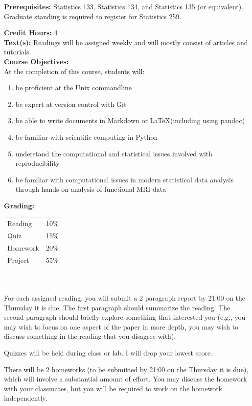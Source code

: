 \documentclass[11pt]{article}
\begin{document}
\textbf {Prerequisites:} Statistics 133, Statistics 134, and Statistics 135
(or equivalent). Graduate standing is required to register for Statistics 259.

\textbf {Credit Hours:} 4 \\

\textbf {\large Text(s):} 
Readings will be assigned weekly and will mostly consist of articles and tutorials. \\

\textbf {\large Course Objectives:} \\
At the completion of this course, students will:
\begin{enumerate} \itemsep-0.4em
  \item be proficient at the Unix commandline
  \item be expert at version control with Git
  \item be able to write documents in Markdown or \LaTeX (including using
        pandoc)
  \item be familiar with scientific computing in Python
  \item understand the computational and statistical issues involved with
        reproducibility
  \item be familiar with computational issues in modern statistical data
        analysis through hands-on analysis of functional MRI data
\end{enumerate}

\textbf {\large Grading:} \\
\hspace*{40mm}
\begin{tabular}{ l l }
Reading  & 10\% \\
Quiz  & 15\% \\
Homework & 20\% \\
Project  & 55\%
\end{tabular} \\\\

For each assigned reading, you will submit a 2 paragraph report
by 21:00 on the Thursday it is due.
The first paragraph should summarize the reading.  The second paragraph
should briefly explore something that interested you (e.g., you
may wish to focus on one aspect of the paper in more depth, you
may wish to discuss something in the reading that you disagree
with).

Quizzes will be held during class or lab.  I will drop your
lowest score.

There will be 2 homeworks (to be submitted by 21:00 on the Thursday it is
due), which will involve a substantial amount of
effort.  You may discuss the homework with your classmates, but you will
be required to work on the homework independently.
\end{document}
